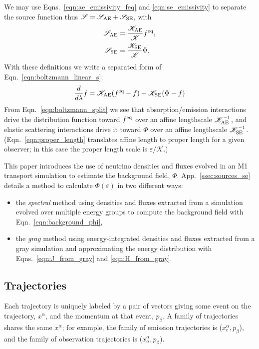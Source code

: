 \documentclass[aps,floatfix,prd,superscriptaddress,twocolumn]{revtex4-1}
\begin{document}
We may use Eqns.~\ref{eqn:ae_emissivity_feq} and \ref{eqn:se_emissivity}
to separate the source function thus
$\mathscr{S}=\mathscr{S}_{\rm AE}+\mathscr{S}_{\rm SE}$, with
\begin{align}
  \label{eqn:source_ae}
  \mathscr{S}_{\rm AE}
  &= \frac{\mathscr{K}_{\rm AE}}{\mathscr{K}} f^{\rm eq}, \\
  \label{eqn:source_se}
  \mathscr{S}_{\rm SE}
  &= \frac{\mathscr{K}_{\rm SE}}{\mathscr{K}} \Phi.
\end{align}
With these definitions we write a separated form of
Eqn.~\ref{eqn:boltzmann_linear_s}:
\begin{equation}
  \label{eqn:boltzmann_split}
  \frac{d}{d\lambda}f =
  \mathscr{K}_{\rm AE}(f^{\rm eq}-f)
  + \mathscr{K}_{\rm SE}(\Phi-f)
\end{equation}
From Eqn.~\ref{eqn:boltzmann_split} we see that
absorption/emission interactions drive the distribution function
toward $f^{\rm eq}$ over an affine lengthscale $\mathscr{K}_{\rm AE}^{-1}$,
and elastic scattering interactions drive it
toward $\Phi$ over an affine lengthscale $\mathscr{K}_{\rm SE}^{-1}$.
(Eqn.~\ref{eqn:proper_length} translates affine length to proper length
for a given observer; in this case the proper length scale is
$\varepsilon/\mathscr{K}$.)

This paper introduces the use of neutrino densities and fluxes evolved in an
M1 transport simulation to estimate the background field, $\Phi$.
App.~\ref{ssec:sources_se} details a method to calculate
$\Phi(\varepsilon)$ in two different ways:
\begin{itemize}
\item
  the \emph{spectral} method using densities and fluxes
  extracted from a simulation evolved over multiple energy groups
  to compute the background field with Eqn.~\ref{eqn:background_phi},
\item
  the \emph{gray} method using energy-integrated densities and fluxes
  extracted from a gray simulation and approximating the
  energy distribution with Eqns.~\ref{eqn:J_from_gray} and
  \ref{eqn:H_from_gray}.
\end{itemize}

\subsection{Trajectories}
\label{ssec:trajectories}
Each trajectory is uniquely labeled by a pair of vectors
giving some event on the trajectory, $x^\alpha$,
and the momentum at that event, $p_\beta$.
A family of trajectories shares the same $x^\alpha$; for example,
the family of emission trajectories is ($x^\alpha_e,p_\beta$),
and the family of observation trajectories is ($x^\alpha_o,p_\beta$).
\end{document}
